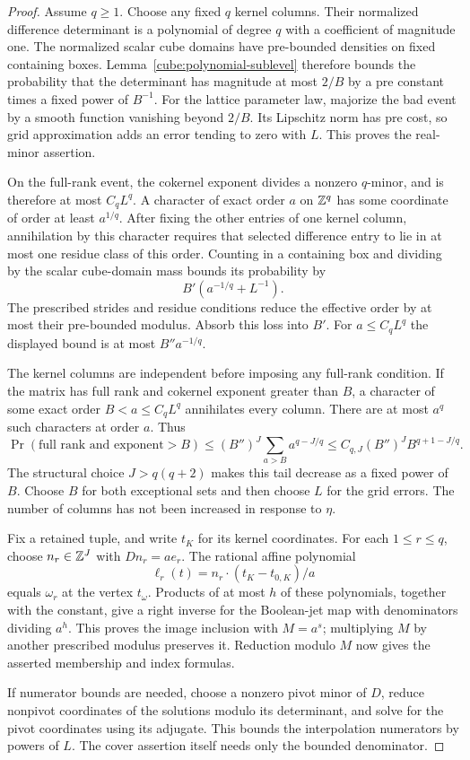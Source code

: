 \begin{proof}
Assume $q\ge1$. Choose any fixed $q$ kernel columns. Their
normalized difference determinant is a polynomial of degree
$q$ with a coefficient of magnitude one. The normalized scalar
cube domains have pre-bounded densities on fixed containing
boxes. Lemma~\ref{cube:polynomial-sublevel} therefore bounds
the probability that the determinant has magnitude at most
$2/B$ by a pre constant times a fixed power of $B^{-1}$.
For the lattice parameter law, majorize the bad event by a
smooth function vanishing beyond $2/B$. Its Lipschitz norm
has pre cost, so grid approximation adds an error tending to
zero with $L$. This proves the real-minor assertion.

On the full-rank event, the cokernel exponent divides a
nonzero $q$-minor, and is therefore at most $C_qL^q$.
A character of exact order $a$ on $\mathbb Z^q$ has some coordinate
of order at least $a^{1/q}$. After fixing the other entries
of one kernel column, annihilation by this character requires
that selected difference entry to lie in at most one residue
class of this order. Counting in a containing box and dividing
by the scalar cube-domain mass bounds its probability by
\[
                       B'(a^{-1/q}+L^{-1}).
\]
The prescribed strides and residue conditions reduce the
effective order by at most their pre-bounded modulus. Absorb
this loss into $B'$. For $a\le C_qL^q$ the displayed bound
is at most $B''a^{-1/q}$.

The kernel columns are independent before imposing any
full-rank condition. If the matrix has full rank and cokernel
exponent greater than $B$, a character of some exact order
$B<a\le C_qL^q$ annihilates every column. There are at most
$a^q$ such characters at order $a$. Thus
\[
 \Pr(\text{full rank and exponent}>B)
 \le (B'')^J\sum_{a>B}a^{q-J/q}
 \le C_{q,J}(B'')^J B^{q+1-J/q}.
\]
The structural choice $J>q(q+2)$ makes this tail decrease
as a fixed power of $B$. Choose $B$ for both exceptional
sets and then choose $L$ for the grid errors. The number of
columns has not been increased in response to $\eta$.

Fix a retained tuple, and write $t_K$ for its kernel
coordinates. For each $1\le r\le q$, choose
$n_r\in\mathbb Z^J$ with $Dn_r=ae_r$. The rational affine
polynomial
\[
                    \ell_r(t)=
                    n_r\cdot(t_K-t_{0,K})/a
\]
equals $\omega_r$ at the vertex $t_\omega$. Products of at
most $h$ of these polynomials, together with the constant,
give a right inverse for the Boolean-jet map with
denominators dividing $a^h$. This proves the image inclusion
with $M=a^s$; multiplying $M$ by another prescribed modulus
preserves it. Reduction modulo $M$ now gives the asserted
membership and index formulas.

If numerator bounds are needed, choose a nonzero pivot minor
of $D$, reduce nonpivot coordinates of the solutions modulo
its determinant, and solve for the pivot coordinates using
its adjugate. This bounds the interpolation numerators by
powers of $L$. The cover assertion itself needs only the
bounded denominator.
\end{proof}

